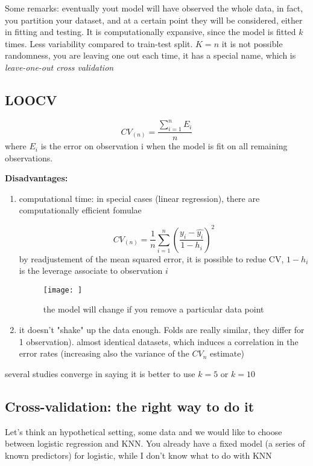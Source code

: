 Some remarks: eventually yout model will have observed the whole data, in fact, you partition your dataset, and at a certain point they will be considered, either in fitting and testing. It is computationally expansive, since the model is fitted $k$ times. Less variability compared to train-test split. $K = n$ it is not possible randomness, you are leaving one out each time, it has a special name, which is \emph{leave-one-out cross validation}


\subsection{LOOCV}
$$ CV_(n) = \frac{\sum_{i=1}^n E_i}{n}$$ where $E_i$ is the error on observation i when the model is fit on all remaining observations.

\textbf{Disadvantages:}
\begin{enumerate}
	\item  computational time: in special cases (linear regression), there are computationally efficient fomulae
	
	$$ CV_(n) = \frac{1}{n} \sum_{i=1}^n (\frac{y_i - \hat{y_i}}{1- h_i})^2 $$
	by readjustement of the mean squared error, it is possible to redue CV, $	1- h_i$ is the 		leverage associate to observation $i$
	
	\begin{figure}[h]
	\caption{the model will change if you remove a particular data point}
	\centering
	\texttt{[image: ]}
	\label{}
	\end{figure}
	
	\item it doesn't "shake" up the data enough. Folds are really similar, they differ for 1 observation). almost identical datasets, which induces a correlation in the error rates (increasing also the variance of the $CV_{n}$ estimate)
\end{enumerate}

several studies converge in saying it is better to use $k = 5$ or $k = 10$

\subsection{Cross-validation: the right way to do it}
Let's think an hypothetical setting, some data and we would like to choose between logistic regression and KNN. You already have a fixed model (a series of known predictors) for logistic, while I don't know what to do with KNN\\

